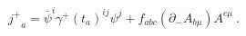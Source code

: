 \begin{equation}
{j^{+}}_{a}={{\bar\psi}}^{i} \gamma^{+} (
{t_{a}})^{ij}{{\psi}}^{j} + f_{abc} (\partial_{-} A_{b\mu})
A^{c\mu} \ .
\end{equation}

